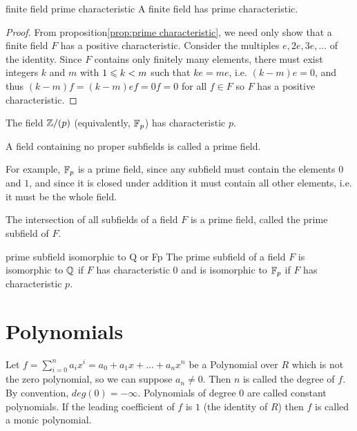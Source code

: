 \begin{corollary}{}{finite field prime characteristic}
    A finite field has prime characteristic.
\end{corollary}
\begin{proof}
    From proposition\ref{prop:prime characteristic}, 
    we need only show that a finite field $F$ has a positive characteristic.
    Consider the multiples $e,2e,3e,...$ of the identity. Since $F$ contains only finitely many elements,
    there must exist integers $k$ and $m$ with $1\leqslant k<m$ such that $ke=me$, i.e. $(k-m)e=0$,
    and thus $(k-m)f=(k-m)ef=0f=0$ for all $f\in F$ so $F$ has a positive characteristic.
\end{proof}

\begin{example}{}{}
    The field $\mathbb{Z}/(p)$ (equivalently, $\mathbb{F}_p$) has characteristic $p$.
\end{example}

\begin{definition}{}{}
    A field containing no proper subfields is called a prime field.
\end{definition}

For example, $\mathbb{F}_p$ is a prime field, since any subfield must contain the elements $0$ and $1$, and since it
is closed under addition it must contain all other elements, i.e. it must be the whole field.

\begin{proposition}{}{}
    The intersection of all subfields of a field $F$ is a prime field, 
    called the prime subfield of $F$.
\end{proposition}

\begin{proposition}{}{prime subfield isomorphic to Q or Fp}
    The prime subfield of a field $F$ is isomorphic to $\mathbb{Q}$ 
    if $F$ has characteristic $0$ and 
    is isomorphic to $\mathbb{F}_p$
    if $F$ has characteristic $p$.
\end{proposition}

\section{Polynomials}

\begin{definition}{}{}
    Let $f=\sum\limits_{i=0}^{n}a_ix^i=a_0+a_1x+...+a_nx^n$
    be a Polynomial over $R$ which is not the zero polynomial, 
    so we can suppose $a_n\neq 0$. Then $n$ is called the degree of $f$.
    By convention, $deg(0)=-\infty$. Polynomials of degree $0$ are called constant polynomials.
    If the leading coefficient of $f$ is $1$ (the identity of $R$) then $f$ is called a monic polynomial.
\end{definition}

